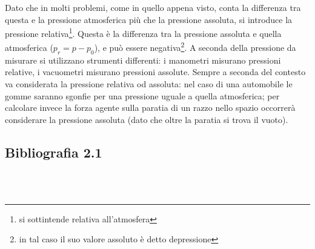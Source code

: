 Dato che in molti problemi, come in quello appena visto, conta la differenza tra questa e la pressione atmosferica più che la pressione assoluta, si introduce la pressione relativa\footnote{si sottintende relativa all'atmosfera}.
Questa è la differenza tra la pressione assoluta e quella atmosferica ($p_r = p - p_0$), e può essere negativa\footnote{in tal caso il suo valore assoluto è detto depressione}.
A seconda della pressione da misurare si utilizzano strumenti differenti: i manometri misurano pressioni relative, i vacuometri misurano pressioni assolute.
Sempre a seconda del contesto va considerata la pressione relativa od assoluta: nel caso di una automobile le gomme saranno sgonfie per una pressione uguale a quella atmosferica; per calcolare invece la forza agente sulla paratia di un razzo nello spazio occorrerà considerare la pressione assoluta (dato che oltre la paratia si trova il vuoto).

\subsection*{Bibliografia 2.1}
\cite[Cap.\ 3.1]{CengelCimbala}\\
\cite[Cap.\ 1.3.2]{LuchiniQuadrio}\\
\cite[Cap.\ 2.13]{PnueliGutfinger}



